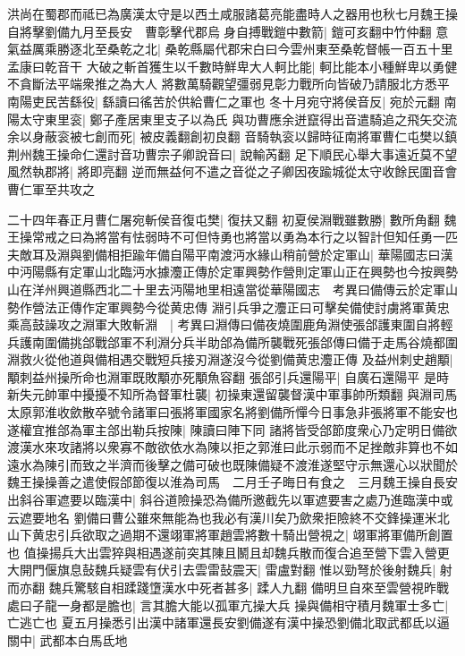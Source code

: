 洪尚在蜀郡而祗已為廣漢太守是以西土咸服諸葛亮能盡時人之器用也秋七月魏王操自將擊劉備九月至長安　曹彰擊代郡烏身自搏戰鎧中數箭|{
	鎧可亥翻中竹仲翻}
意氣益厲乘勝逐北至桑乾之北|{
	桑乾縣屬代郡宋白曰今雲州東至桑乾督帳一百五十里孟康曰乾音干}
大破之斬首獲生以千數時鮮卑大人軻比能|{
	軻比能本小種鮮卑以勇健不貪斷法平端衆推之為大人}
將數萬騎觀望彊弱見彰力戰所向皆破乃請服北方悉平　南陽吏民苦繇役|{
	繇讀曰徭苦於供給曹仁之軍也}
冬十月宛守將侯音反|{
	宛於元翻}
南陽太守東里衮|{
	鄭子產居東里支子以為氏}
與功曹應余迸竄得出音遣騎追之飛矢交流余以身蔽衮被七創而死|{
	被皮義翻創初良翻}
音騎執衮以歸時征南將軍曹仁屯樊以鎮荆州魏王操命仁還討音功曹宗子卿說音曰|{
	說輸芮翻}
足下順民心舉大事遠近莫不望風然執郡將|{
	將即亮翻}
逆而無益何不遣之音從之子卿因夜踰城從太守收餘民圍音會曹仁軍至共攻之

二十四年春正月曹仁屠宛斬侯音復屯樊|{
	復扶又翻}
初夏侯淵戰雖數勝|{
	數所角翻}
魏王操常戒之曰為將當有怯弱時不可但恃勇也將當以勇為本行之以智計但知任勇一匹夫敵耳及淵與劉備相拒踰年備自陽平南渡沔水緣山稍前營於定軍山|{
	華陽國志曰漢中沔陽縣有定軍山北臨沔水據灋正傳於定軍興勢作營則定軍山正在興勢也今按興勢山在洋州興道縣西北二十里去沔陽地里相遠當從華陽國志　考異曰備傳云於定軍山勢作營法正傳作定軍興勢今從黄忠傳}
淵引兵爭之灋正曰可擊矣備使討虜將軍黄忠乘高鼓譟攻之淵軍大敗斬淵　|{
	考異曰淵傳曰備夜燒圍鹿角淵使張郃護東圍自將輕兵護南圍備挑郃戰郃軍不利淵分兵半助郃為備所襲戰死張郃傳曰備于走馬谷燒都圍淵救火從他道與備相遇交戰短兵接刃淵遂沒今從劉備黄忠灋正傳}
及益州刺史趙顒|{
	顒刺益州操所命也淵軍既敗顒亦死顒魚容翻}
張郃引兵還陽平|{
	自廣石還陽平}
是時新失元帥軍中擾擾不知所為督軍杜襲|{
	初操東還留襲督漢中軍事帥所類翻}
與淵司馬太原郭淮收歛散卒號令諸軍曰張將軍國家名將劉備所憚今日事急非張將軍不能安也遂權宜推郃為軍主郃出勒兵按陳|{
	陳讀曰陣下同}
諸將皆受郃節度衆心乃定明日備欲渡漢水來攻諸將以衆寡不敵欲依水為陳以拒之郭淮曰此示弱而不足挫敵非算也不如遠水為陳引而致之半濟而後擊之備可破也既陳備疑不渡淮遂堅守示無還心以狀聞於魏王操操善之遣使假郃節復以淮為司馬　二月壬子晦日有食之　三月魏王操自長安出斜谷軍遮要以臨漢中|{
	斜谷道險操恐為備所邀截先以軍遮要害之處乃進臨漢中或云遮要地名}
劉備曰曹公雖來無能為也我必有漢川矣乃歛衆拒險終不交鋒操運米北山下黄忠引兵欲取之過期不還翊軍將軍趙雲將數十騎出營視之|{
	翊軍將軍備所創置也}
值操揚兵大出雲猝與相遇遂前突其陳且鬭且却魏兵散而復合追至營下雲入營更大開門偃旗息鼔魏兵疑雲有伏引去雲雷鼔震天|{
	雷盧對翻}
惟以勁弩於後射魏兵|{
	射而亦翻}
魏兵驚駭自相蹂踐墯漢水中死者甚多|{
	蹂人九翻}
備明旦自來至雲營視昨戰處曰子龍一身都是膽也|{
	言其膽大能以孤軍亢操大兵}
操與備相守積月魏軍士多亡|{
	亡逃亡也}
夏五月操悉引出漢中諸軍還長安劉備遂有漢中操恐劉備北取武都氐以逼關中|{
	武都本白馬氐地}
